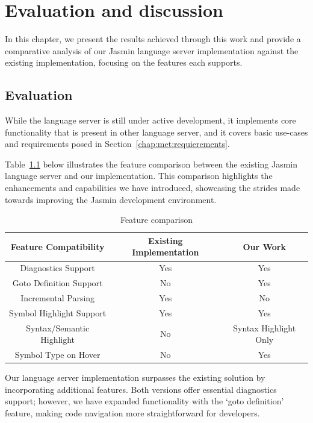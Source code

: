 \chapter{Evaluation and discussion}
\label{chap:discussion}

In this chapter, we present the results achieved through this work and provide a
comparative analysis of our Jasmin language server implementation against the
existing implementation, focusing on the features each supports.

\section{Evaluation}

While the language server is still under active development, it implements 
core functionality that is present in other language server, and it covers 
basic use-cases and requirements posed in Section~\ref{chap:met:requierements}.

Table~\ref{table:feature-comparison} below illustrates the feature comparison
between the existing Jasmin language server and our implementation. This
comparison highlights the enhancements and capabilities we have introduced,
showcasing the strides made towards improving the Jasmin development
environment.
    
\begin{longtable}[h]{c|c|c}
\caption[Language server features comparison table]{Feature comparison} \label{table:feature-comparison} \\
\hline
Feature Compatibility     & Existing Implementation & Our Work              \\
\hline
\endfirsthead
Diagnostics Support       & Yes                                & Yes                   \\
Goto Definition Support   & No                                 & Yes                   \\
Incremental Parsing       & Yes                                & No                    \\
Symbol Highlight Support  & Yes                                & Yes                   \\
Syntax/Semantic Highlight & No                                 & Syntax Highlight Only \\
Symbol Type on Hover      & No                                 & Yes                  
\end{longtable}

Our language server implementation surpasses the existing solution by
incorporating additional features. Both versions offer essential diagnostics
support; however, we have expanded functionality with the `goto definition'
feature, making code navigation more straightforward for developers.


